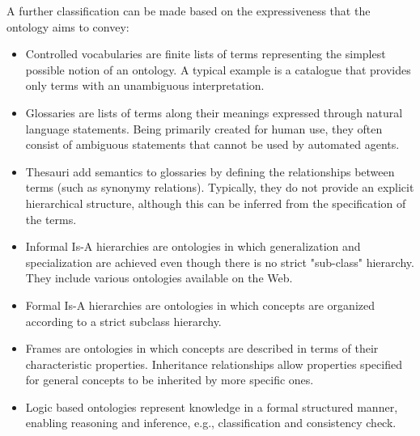 A further classification can be made based on the expressiveness that the ontology aims to convey:
\begin{itemize}
    \item Controlled vocabularies are finite lists of terms representing the simplest possible notion of an ontology. A typical example is a catalogue that provides only terms with an unambiguous interpretation.
    \item Glossaries are lists of terms along their meanings expressed through natural language statements. Being primarily created for human use, they often consist of ambiguous statements that cannot be used by automated agents.
    \item Thesauri add semantics to glossaries by defining the relationships between terms (such as synonymy relations). Typically, they do not provide an explicit hierarchical structure, although this can be inferred from the specification of the terms.
    \item Informal Is-A hierarchies are ontologies in which generalization and specialization are achieved even though there is no strict "sub-class" hierarchy. They include various ontologies available on the Web.
    \item Formal Is-A hierarchies are ontologies in which concepts are organized according to a strict subclass hierarchy.
    \item Frames are ontologies in which concepts are described in terms of their characteristic properties. Inheritance relationships allow properties specified for general concepts to be inherited by more specific ones.
   \item Logic based ontologies represent knowledge in a formal structured manner, enabling reasoning and inference, e.g., classification and consistency check.
\end{itemize}

